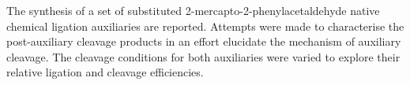 


\begin{abstracts}        %

The synthesis of a set of substituted 2-mercapto-2-phenylacetaldehyde native chemical ligation auxiliaries are reported. Attempts were made to characterise the post-auxiliary cleavage products in an effort elucidate the mechanism of auxiliary cleavage. The cleavage conditions for both auxiliaries were varied to explore their relative ligation and cleavage efficiencies.

\end{abstracts}




